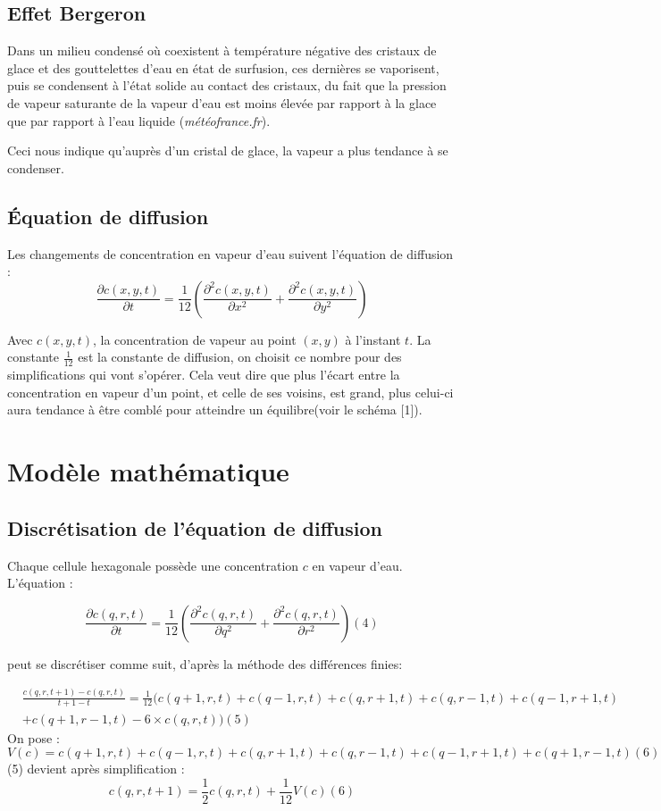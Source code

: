 \documentclass[a4paper,12pt,twoside]{report}
\begin{document}
\subsection{Effet Bergeron}Dans un milieu condensé où coexistent à température négative des cristaux de glace et des gouttelettes d'eau en état de surfusion, ces dernières se vaporisent, puis se condensent à l'état solide au contact des cristaux, du fait que la pression de vapeur saturante de la vapeur d'eau est moins élevée par rapport à la glace que par rapport à l'eau liquide (\emph{météofrance.fr}).

Ceci nous indique qu’auprès d’un cristal de glace, la vapeur a plus tendance à se condenser.
\subsection{Équation de diffusion}Les changements de concentration en vapeur d’eau suivent l’équation de diffusion :
$$\frac{\partial c\left ( x,y,t \right )}{\partial t}=\frac{1}{12}\left(\frac{\partial^2 c\left ( x,y,t \right )}{\partial x^2} + \frac{\partial^2 c\left ( x,y,t \right )}{\partial y^2}\right)$$

Avec $c\left ( x,y,t \right )$, la concentration de vapeur au point $\left(x,y\right)$ à l’instant $t$.
La constante $\frac{1}{12}$ est la constante de diffusion, on choisit ce nombre pour des simplifications qui vont s’opérer.
Cela veut dire que plus l’écart entre la concentration en vapeur d’un point, et celle de ses voisins, est grand, plus celui-ci aura tendance à être comblé pour atteindre un équilibre(voir le schéma [1]).

\section{Modèle mathématique}
\subsection{Discrétisation de l’équation de diffusion}Chaque cellule hexagonale possède une concentration $c$ en vapeur d’eau. L’équation :

$$\frac{\partial c\left ( q,r,t \right )}{\partial t}=\frac{1}{12}\left(\frac{\partial^2 c\left ( q,r,t \right )}{\partial q^2} + \frac{\partial^2 c\left ( q,r,t \right )}{\partial r^2}\right)(4)$$


peut se discrétiser comme suit, d’après la méthode des différences finies:

\begin{align}
	 &\frac{ c\left ( q,r,t+1 \right ) - c\left ( q,r,t \right )}{t+1-t}= \frac{1}{12}(c(q+1,r,t) + c(q-1,r,t) + c(q,r+1,t)+ c(q,r-1,t)+ c(q-1,r+1,t) \\
      &+ c(q+1,r-1,t) - 6\times c(q,r,t)) (5) 
\end{align}
\bigbreak
On pose :
$$V(c) = c(q+1,r,t) + c(q-1,r,t) + c(q,r+1,t)+ c(q,r-1,t)+ c(q-1,r+1,t)+ c(q+1,r-1,t)  (6)$$
\bigbreak
(5) devient après simplification :
$$ c\left ( q,r,t+1 \right ) = \frac{1}{2}c\left ( q,r,t \right ) + \frac{1}{12}V(c) (6)$$
\end{document}
